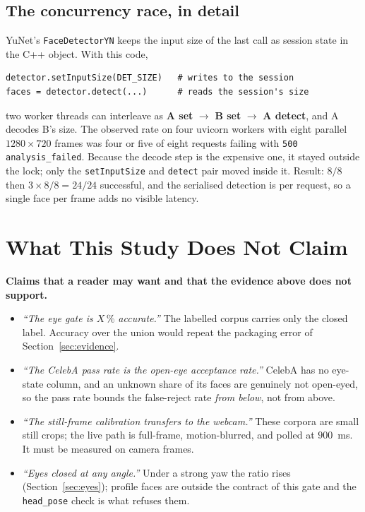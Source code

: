 \documentclass[11pt,a4paper]{article}
\newcommand{\coden}[1]{\texttt{\small #1}}
\begin{document}
\subsection{The concurrency race, in detail}

YuNet's \coden{FaceDetectorYN} keeps the input size of the last call as
session state in the C++ object. With this code,

\begin{lstlisting}
detector.setInputSize(DET_SIZE)   # writes to the session
faces = detector.detect(...)      # reads the session's size
\end{lstlisting}

two worker threads can interleave as
\textbf{A set} $\to$ \textbf{B set} $\to$ \textbf{A detect}, and A
decodes B's size. The observed rate on four uvicorn workers with eight
parallel $1280\times720$ frames was four or five of eight requests
failing with \texttt{500 analysis\_failed}. Because the decode step is
the expensive one, it stayed outside the lock; only the
\coden{setInputSize} and \coden{detect}
pair moved inside it. Result: $8/8$ then $3\times8/8 = 24/24$ successful,
and the serialised detection is per request, so a single face per frame
adds no visible latency.
\section{What This Study Does Not Claim}
\label{sec:limits}

\begin{warnbox}
\textbf{Claims that a reader may want and that the evidence above does not
support.}
\begin{itemize}
  \item \emph{``The eye gate is $X\,\%$ accurate.''} The labelled corpus
        carries only the closed label. Accuracy over the union would
        repeat the packaging error of Section~\ref{sec:evidence}.
  \item \emph{``The CelebA pass rate is the open-eye acceptance rate.''}
        CelebA has no eye-state column, and an unknown share of its
        faces are genuinely not open-eyed, so the pass rate bounds the
        false-reject rate \emph{from below}, not from above.
  \item \emph{``The still-frame calibration transfers to the webcam.''}
        These corpora are small still crops; the live path is full-frame,
        motion-blurred, and polled at $900$~ms. It must be measured on camera
        frames.
  \item \emph{``Eyes closed at any angle.''} Under a strong yaw the
        ratio rises (Section~\ref{sec:eyes}); profile faces are outside
        the contract of this gate and the \coden{head\_pose} check is
        what refuses them.
\end{itemize}
\end{warnbox}
\end{document}
